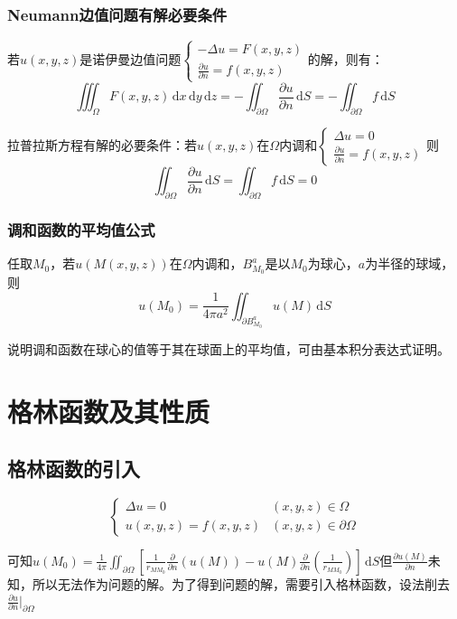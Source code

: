 \subsubsection{Neumann边值问题有解必要条件}

若\(u(x,y,z)\)是诺伊曼边值问题\(\begin{cases}-\Delta u=F(x,y,z)\\\frac{\partial u}{\partial n}=f(x,y,z)\end{cases}\)的解，则有：
\[
\iiint_{\Omega}{F(x,y,z)\,\mathrm{d}x\,\mathrm{d}y\,\mathrm{d}z}=-\iint_{\partial\Omega}\frac{\partial u}{\partial n}\,\mathrm{d}S=-\iint_{\partial\Omega} f\,\mathrm{d}S
\]

拉普拉斯方程有解的必要条件：若\(u(x,y,z)\)在\(\Omega\)内调和\(\begin{cases}\Delta u=0\\\frac{\partial u}{\partial n}=f(x,y,z)\end{cases}\)则
\[
\iint_{\partial\Omega}\frac{\partial u}{\partial n}\,\mathrm{d}S=\iint_{\partial\Omega} f\,\mathrm{d}S=0
\]

\subsubsection{调和函数的平均值公式}

任取\(M_0\)，若\(u(M(x,y,z))\)在\(\Omega\)内调和，\(B_{M_0}^a\)是以\(M_0\)为球心，\(a\)为半径的球域，则
\[
u(M_0)=\frac{1}{4\pi a^2}\iint_{\partial B_{M_0}^a}{u(M)\,\mathrm{d}S}
\]

说明调和函数在球心的值等于其在球面上的平均值，可由基本积分表达式证明。

\section{格林函数及其性质}

\subsection{格林函数的引入}
\[\begin{cases}
\Delta u=0&(x,y,z)\in\Omega\\
u(x,y,z)=f(x,y,z)&(x,y,z)\in\partial\Omega
\end{cases}\]

可知\(u(M_0)=\frac{1}{4\pi}\iint_{\partial\Omega}\left[\frac{1}{r_{MM_0}}\frac{\partial}{\partial n}(u(M))-u(M)\frac{\partial}{\partial n}\left(\frac{1}{r_{MM_0}}\right)\right]\,\mathrm{d}S\)但\(\frac{\partial u\left(M\right)}{\partial n}\)未知，所以无法作为问题的解。为了得到问题的解，需要引入格林函数，设法削去\(\frac{\partial u}{\partial n}|_{\partial\Omega}\)

